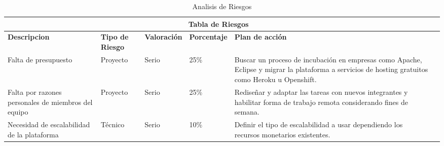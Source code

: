     \begin{table}[b!]
    \centering
      \begin{tabular}{|p{3cm}|lllll}
        \hline
        \multicolumn{5}{|c|}{{\bf Tabla de Riesgos}} \\ 
        \hline
          \multicolumn{1}{|p{3cm}|}{{\bf Descripcion}} & 
          \multicolumn{1}{p{2cm}|}{{\bf Tipo de Riesgo}} & 
          \multicolumn{1}{p{2cm}|}{{\bf Valoración}} & 
          \multicolumn{1}{p{2cm}|}{{\bf Porcentaje}} & 
          \multicolumn{1}{p{5cm}|}{{\bf Plan de acción}} \\ 
        \hline
          \multicolumn{1}{|p{3cm}|}{Falta de presupuesto} & 
          \multicolumn{1}{p{2cm}|}{Proyecto} & 
          \multicolumn{1}{p{2cm}|}{Serio} & 
          \multicolumn{1}{p{2cm}|}{25\%} & 
          \multicolumn{1}{p{5cm}|}{Buscar un proceso de incubación en empresas como Apache, Eclipse y migrar la plataforma a servicios de hosting gratuitos como Heroku u Openshift.} \\ 
        \hline
          \multicolumn{1}{|p{3cm}|}{Falta por razones personales de miembros del equipo} & 
          \multicolumn{1}{p{2cm}|}{Proyecto} &
          \multicolumn{1}{p{2cm}|}{Serio} & 
          \multicolumn{1}{p{2cm}|}{25\%} & 
          \multicolumn{1}{p{5cm}|}{Rediseñar y adaptar las tareas con nuevos integrantes y habilitar forma de trabajo remota considerando fines de semana.} \\ 
        \hline
          \multicolumn{1}{|p{3cm}|}{Necesidad de escalabilidad de la plataforma} & 
          \multicolumn{1}{p{2cm}|}{Técnico} & 
          \multicolumn{1}{p{2cm}|}{Serio} & 
          \multicolumn{1}{p{2cm}|}{10\%} & 
          \multicolumn{1}{p{5cm}|}{Definir el tipo de escalabilidad a usar dependiendo los recursos monetarios existentes.} \\ 
        \hline
      \end{tabular}
      \caption{Analisis de Riesgos}
      \label{table: Analisis de riesgos}
    \end{table}
    \clearpage